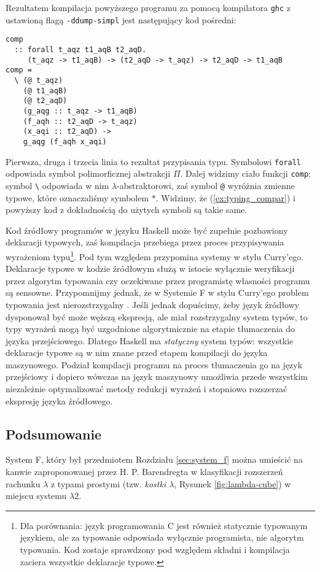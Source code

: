 Rezultatem kompilacja powyższego programu za pomocą kompilatora \texttt{ghc} z ustawioną flagą \texttt{-ddump-simpl} jest następujący kod pośredni:

\begin{verbatim}
comp
  :: forall t_aqz t1_aqB t2_aqD.
     (t_aqz -> t1_aqB) -> (t2_aqD -> t_aqz) -> t2_aqD -> t1_aqB
comp =
  \ (@ t_aqz)
    (@ t1_aqB)
    (@ t2_aqD)
    (g_aqg :: t_aqz -> t1_aqB)
    (f_aqh :: t2_aqD -> t_aqz)
    (x_aqi :: t2_aqD) ->
    g_aqg (f_aqh x_aqi)
\end{verbatim}

Pierwsza, druga i trzecia linia to rezultat przypisania typu. Symbolowi \texttt{forall} odpowiada symbol polimorficznej abstrakcji \(\Pi\). Dalej widzimy ciało funkcji \texttt{comp}: symbol \texttt{\textbackslash} odpowiada w nim \(\lambda\)-abstraktorowi, zaś symbol \texttt{@} wyróżnia zmienne typowe, które oznaczaliśmy symbolem \(\ast\). Widzimy, że (\ref{ex:typing_compar}) i powyższy kod z dokładnością do użytych symboli są takie same.

Kod źródłowy programów w języku Haskell może być zupełnie pozbawiony deklaracji typowych, zaś kompilacja przebiega przez proces przypisywania wyrażeniom typu\footnote{Dla porównania: język programowania C jest również statycznie typowanym językiem, ale za typowanie odpowiada wyłącznie programista, nie algorytm typowania. Kod zostaje sprawdzony pod względem składni i kompilacja zaciera wszystkie deklaracje typowe.}. Pod tym względem przypomina systemy w stylu Curry'ego. Deklaracje typowe w kodzie źródłowym służą w istocie wyłącznie weryfikacji przez algorytm typowania czy oczekiwane przez programistę własności programu są sensowne. Przypomnijmy jednak, że w Systemie F w stylu Curry'ego problem typowania jest nierozstrzygalny \cite{Wells_98}. Jeśli jednak dopuścimy, żeby język źródłowy dysponował być może węższą ekspresją, ale miał rozstrzygalny system typów, to typy wyrażeń mogą być uzgodnione algorytmicznie na etapie tłumaczenia do języka przejściowego. Dlatego Haskell ma \emph{statyczny} system typów: wszystkie deklaracje typowe są w nim znane przed etapem kompilacji do języka maszynowego. Podział kompilacji programu na proces tłumaczenia go na język przejściowy i dopiero wówczas na język maszynowy umożliwia przede wszystkim niezależnie optymalizować metody redukcji wyrażeń i stopniowo rozszerzać ekspresję języka źródłowego.

\subsection{Podsumowanie}
System F, który był przedmiotem Rozdziału \ref{sec:system_f} można umieścić na kanwie zaproponowanej przez H. P. Barendregta w \cite[Rozdział 5]{Barendregt_1992} klasyfikacji rozszerzeń rachunku \(\lambda\) z typami prostymi (tzw. \emph{kostki \(\lambda\)}, Rysunek \ref{fig:lambda-cube}) w miejscu systemu \(\lambda 2\). 

